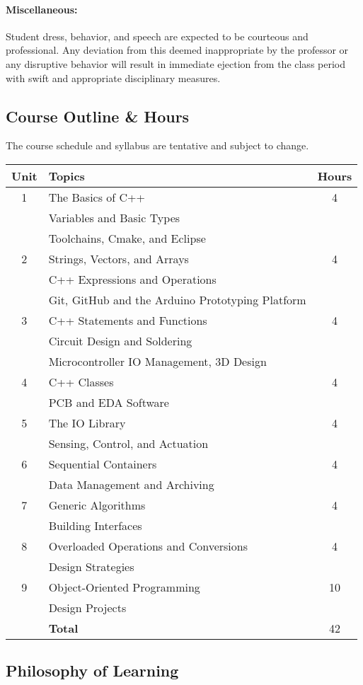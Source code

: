 \documentclass{article}
\begin{document}
\paragraph{Miscellaneous:}
Student dress, behavior, and speech are expected to be courteous and professional.
Any deviation from this deemed inappropriate by the professor or any disruptive behavior will result in immediate ejection from the class period with swift and appropriate disciplinary measures.

\newpage

\subsection*{Course Outline \& Hours}

The course schedule and syllabus are tentative and subject to change.

\begin{center}
\begin{tabular}{|c|p{8cm}|c|}
\hline
Unit & Topics & Hours \tabularnewline
\hline
1 & The Basics of C++ & 4 \tabularnewline
& Variables and Basic Types & \tabularnewline
& Toolchains, Cmake, and Eclipse & \tabularnewline
\hline
2 & Strings, Vectors, and Arrays & 4 \tabularnewline
& C++ Expressions and Operations & \tabularnewline
& Git, GitHub and the Arduino Prototyping Platform & \tabularnewline
\hline
3 & C++ Statements and Functions & 4 \tabularnewline
& Circuit Design and Soldering & \tabularnewline
& Microcontroller IO Management, 3D Design & \tabularnewline
\hline
4 & C++ Classes & 4 \tabularnewline
& PCB and EDA Software & \tabularnewline
\hline
5 & The IO Library & 4 \tabularnewline
& Sensing, Control, and Actuation & \tabularnewline
\hline
6 & Sequential Containers & 4 \tabularnewline
& Data Management and Archiving & \tabularnewline
\hline
7 & Generic Algorithms & 4 \tabularnewline
& Building Interfaces & \tabularnewline
\hline
8 & Overloaded Operations and Conversions & 4 \tabularnewline
& Design Strategies & \tabularnewline
\hline
9 & Object-Oriented Programming & 10 \tabularnewline
& Design Projects & \tabularnewline
\hline
& \textbf{Total} & 42 \tabularnewline
\hline
\end{tabular}
\end{center}


\subsection*{Philosophy of Learning}
\end{document}
